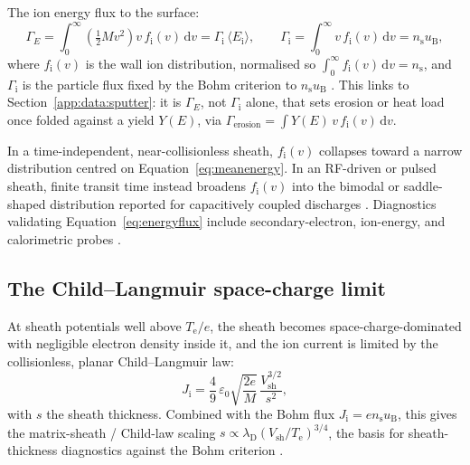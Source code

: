 The ion energy flux to the surface:
\begin{equation}
\Gamma_{E} = \int_{0}^{\infty} \left(\tfrac{1}{2} M v^{2}\right) v\, f_{\mathrm{i}}(v)\, \mathrm{d}v
= \Gamma_{\mathrm{i}} \, \langle E_{\mathrm{i}} \rangle,
\qquad
\Gamma_{\mathrm{i}} = \int_{0}^{\infty} v\, f_{\mathrm{i}}(v)\, \mathrm{d}v = n_{\mathrm{s}} u_{\mathrm{B}},
\label{eq:energyflux}
\end{equation}
where $f_{\mathrm{i}}(v)$ is the wall ion distribution, normalised so $\int_0^\infty f_{\mathrm{i}}(v)\,\mathrm{d}v = n_{\mathrm{s}}$, and $\Gamma_{\mathrm{i}}$ is the particle flux fixed by the Bohm criterion to $n_{\mathrm{s}} u_{\mathrm{B}}$ \cite{ref0074,ref0090,ref0093}. This links to Section~\ref{app:data:sputter}: it is $\Gamma_E$, not $\Gamma_{\mathrm{i}}$ alone, that sets erosion or heat load once folded against a yield $Y(E)$, via $\Gamma_{\mathrm{erosion}} = \int Y(E)\, v\, f_{\mathrm{i}}(v)\, \mathrm{d}v$.

In a time-independent, near-collisionless sheath, $f_{\mathrm{i}}(v)$ collapses toward a narrow distribution centred on Equation~\eqref{eq:meanenergy}. In an RF-driven or pulsed sheath, finite transit time instead broadens $f_{\mathrm{i}}(v)$ into the bimodal or saddle-shaped distribution reported for capacitively coupled discharges \cite{ref0105}. Diagnostics validating Equation~\eqref{eq:energyflux} include secondary-electron, ion-energy, and calorimetric probes \cite{ref0080}.

\subsection{The Child--Langmuir space-charge limit}

At sheath potentials well above $T_{\mathrm{e}}/e$, the sheath becomes space-charge-dominated with negligible electron density inside it, and the ion current is limited by the collisionless, planar Child--Langmuir law:
\begin{equation}
J_{\mathrm{i}} = \frac{4}{9}\,\varepsilon_{0}\sqrt{\frac{2e}{M}}\,\frac{V_{\mathrm{sh}}^{3/2}}{s^{2}},
\label{appD-eq:childlangmuir}
\end{equation}
with $s$ the sheath thickness. Combined with the Bohm flux $J_{\mathrm{i}} = e n_{\mathrm{s}} u_{\mathrm{B}}$, this gives the matrix-sheath / Child-law scaling $s \propto \lambda_{\mathrm{D}} (V_{\mathrm{sh}} / T_{\mathrm{e}})^{3/4}$, the basis for sheath-thickness diagnostics against the Bohm criterion \cite{ref0013,ref0017}.

